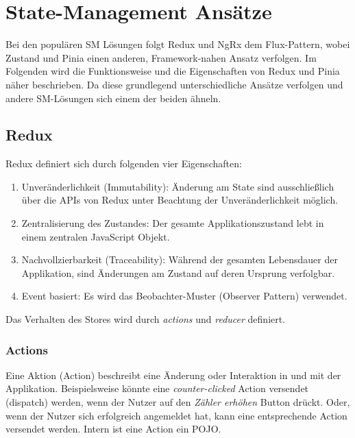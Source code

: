 \chapter{State-Management Ansätze} \label{sm-ansaetze}

Bei den populären SM Lösungen folgt Redux und NgRx dem Flux-Pattern\cite{historyOfRedux}\cite{ngrxGettingStarted}, wobei Zustand und Pinia einen anderen, Framework-nahen Ansatz verfolgen. Im Folgenden wird die Funktionsweise und die Eigenschaften von Redux und Pinia näher beschrieben. Da diese grundlegend unterschiedliche Ansätze verfolgen und andere SM-Lösungen sich einem der beiden ähneln.

\section{Redux}

Redux definiert sich durch folgenden vier Eigenschaften:
\begin{enumerate}
  \item Unveränderlichkeit (Immutability): Änderung am State sind ausschließlich über die APIs von Redux unter Beachtung der Unveränderlichkeit möglich.
  \item Zentralisierung des Zustandes: Der gesamte Applikationszustand lebt in einem zentralen JavaScript Objekt.
  \item Nachvollzierbarkeit (Traceability): Während der gesamten Lebensdauer der Applikation, sind Änderungen am Zustand auf deren Ursprung verfolgbar.
  \item Event basiert: Es wird das Beobachter-Muster (Observer Pattern) verwendet.
\end{enumerate}

Das Verhalten des Stores wird durch \textit{actions} und \textit{reducer} definiert.

\subsection{Actions}

Eine Aktion (Action) beschreibt eine Änderung oder Interaktion in und mit der Applikation. Beispielsweise könnte eine \textit{counter-clicked} Action versendet (dispatch) werden, wenn der Nutzer auf den \textit{Zähler erhöhen} Button drückt. Oder, wenn der Nutzer sich erfolgreich angemeldet hat, kann eine entsprechende Action versendet werden. Intern ist eine Action ein POJO.\cite{reduxStateActionReducers}

